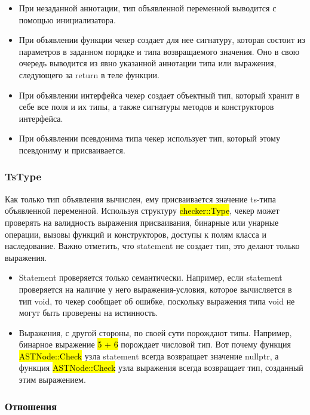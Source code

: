 \begin{itemize}[left=2em]
    \item При незаданной аннотации, тип объявленной переменной выводится с помощью инициализатора.
    \item При объявлении функции чекер создает для нее сигнатуру, которая состоит из параметров в заданном порядке
    и типа возвращаемого значения.
    Оно в свою очередь выводится из явно указанной аннотации типа или выражения, следующего за return в теле функции.
    \item При объявлении интерфейса чекер создает объектный тип, который хранит в себе все поля и их типы, а также
    сигнатуры методов и конструкторов интерфейса.
    \item При объявлении псевдонима типа чекер использует тип, который этому псевдониму и присваивается.
\end{itemize}

\subsubsection{TsType}

Как только тип объявления вычислен, ему присваивается значение ts-типа объявленной переменной.
Используя структуру \hl{checker::Type}, чекер может проверять на валидность выражения присваивания, бинарные или унарные
операции, вызовы функций и конструкторов, доступы к полям класса и наследование.
Важно отметить, что statement не создает тип, это делают только выражения.

\begin{itemize}[left=2em]
    \item Statement проверяется только семантически.
    Например, если statement проверяется на наличие у него выражения-условия,
    которое вычисляется в тип void, то чекер сообщает об ошибке, поскольку выражения типа void не могут быть
    проверены на истинность.
    \item Выражения, с другой стороны, по своей сути порождают типы.
    Например, бинарное выражение \hl{5 + 6} порождает числовой тип.
    Вот почему функция \hl{ASTNode::Check} узла statement всегда возвращает значение nullptr, а функция \hl{ASTNode::Check} узла
    выражения всегда возвращает тип, созданный этим выражением.
\end{itemize}

\subsubsection{Отношения}

